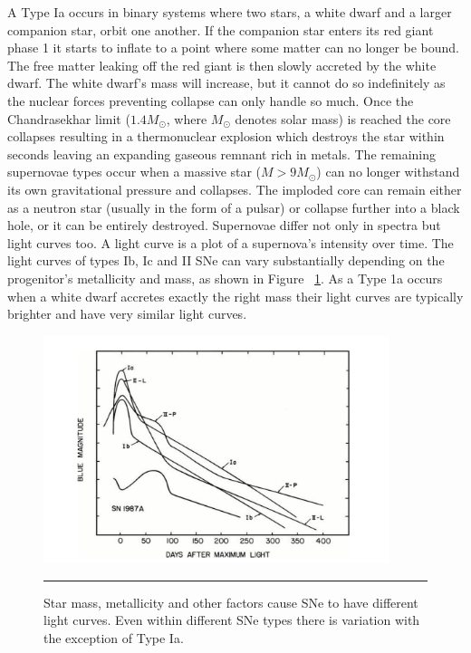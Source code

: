 A Type Ia occurs in binary systems where two stars, a white dwarf and a larger companion star, orbit one another.
If the companion star enters its red giant phase 1 it starts to inflate to a point where some matter can no longer be bound.
The free matter leaking off the red giant is then slowly accreted by the white dwarf.
The white dwarf's mass will increase, but it cannot do so indefinitely as the nuclear forces preventing collapse can only handle so much.
Once the Chandrasekhar limit ($1.4M_{\odot}$, where $M_{\odot}$ denotes solar mass) is reached the core collapses resulting in a thermonuclear explosion which destroys the star within seconds leaving an expanding gaseous remnant rich in metals.
The remaining supernovae types occur when a massive star ($M > 9M_{\odot}$) can no longer withstand its own gravitational pressure and collapses.
The imploded core can remain either as a neutron star (usually in the form of a pulsar) or collapse further into a black hole, or it can be entirely destroyed.
Supernovae differ not only in spectra but light curves too.
A light curve is a plot of a supernova's intensity over time.
The light curves of types Ib, Ic and II SNe can vary substantially depending on the progenitor's metallicity and mass, as shown in Figure ~\ref{fig:supernovae_curve_types}.
As a Type 1a occurs when a white dwarf accretes exactly the right mass their light curves are typically brighter and have very similar light curves.
\begin{figure}[htbp]
	\centering
		\includegraphics[width = 0.9\textwidth]{./Figures/lise_thesis_light_curves_of_SN.PNG}
		\rule{35em}{0.5pt}
	\caption[Supernovae Light Curves]{Star mass, metallicity and other factors cause SNe to have different light curves. Even within different SNe types there is variation with the exception of Type Ia. }
	\label{fig:supernovae_curve_types}
\end{figure}
